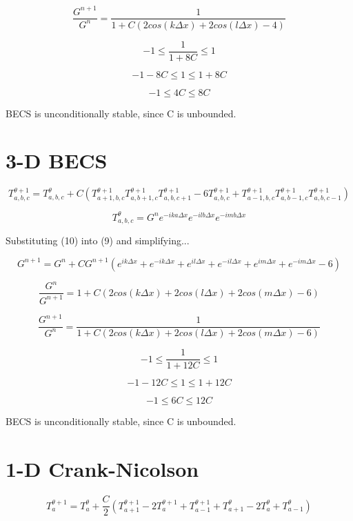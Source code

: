 \documentclass[a4paper,12pt]{article}
\begin{document}
\[
\frac{G^{n+1}}{G^n} = \frac{1}{1 + C
\left(
2cos(k \Delta x) + 2cos(l \Delta x) -  4
\right)}
\]

\[
-1 \leq \frac{1}{1 + 8C} \leq 1
\]

\[
-1-8C \leq 1 \leq 1+8C
\]

\[
-1 \leq 4C \leq 8C
\]

BECS is unconditionally stable, since C is unbounded.

\pagebreak
\section{3-D BECS}

\begin{equation}
T_{a,b,c}^{\theta+1} = T_{a,b,c}^{\theta} + C \left(
T_{a+1,b,c}^{\theta+1}
T_{a,b+1,c}^{\theta+1}
T_{a,b,c+1}^{\theta+1}
- 6T_{a,b,c}^{\theta+1}
+ T_{a-1,b,c}^{\theta+1}
T_{a,b-1,c}^{\theta+1}
T_{a,b,c-1}^{\theta+1}
\right)
\end{equation}

\begin{equation}
T_{a,b,c}^{\theta} = G^n e^{-ika\Delta x} e^{-ilb\Delta x}e^{-imb\Delta x}
\end{equation}

Substituting (10) into (9) and simplifying...

\[
G^{n+1} = G^n + C G^{n+1}
\left(
e^{ik\Delta x} + e^{-ik\Delta x}
+ e^{il\Delta x} + e^{-il\Delta x}
+ e^{im\Delta x} + e^{-im\Delta x}
- 6
\right)
\]

\[
\frac{G^n}{G^{n+1}} = 1 + C
\left(
2cos(k \Delta x) + 2cos(l \Delta x) + 2cos(m \Delta x) - 6
\right)
\]

\[
\frac{G^{n+1}}{G^n} = \frac{1}{1 + C
\left(
2cos(k \Delta x) + 2cos(l \Delta x) + 2cos(m \Delta x) -  6
\right)}
\]

\[
-1 \leq \frac{1}{1 + 12C} \leq 1
\]

\[
-1-12C \leq 1 \leq 1+12C
\]

\[
-1 \leq 6C \leq 12C
\]

BECS is unconditionally stable, since C is unbounded.

\pagebreak
\section{1-D Crank-Nicolson}

\begin{equation}
T_{a}^{\theta+1} = T_{a}^{\theta} + \frac{C}{2} \left(
T_{a+1}^{\theta+1}
- 2T_{a}^{\theta+1}
+ T_{a-1}^{\theta+1}
+ T_{a+1}^{\theta}
- 2T_{a}^{\theta}
+ T_{a-1}^{\theta}
\right)
\end{equation}
\end{document}

